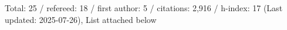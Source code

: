 Total: 25 / refereed: 18 / first author: 5 / citations: 2,916 / h-index: 17 (Last updated: 2025-07-26), List attached below